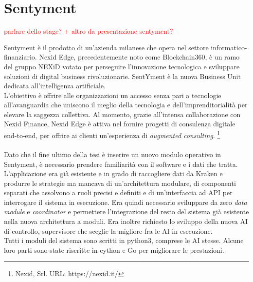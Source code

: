 \documentclass[a4paper,12pt]{report}
\begin{document}
\newpage
\chapter{Sentyment}
\label{cap2}
\textcolor{red}{parlare dello stage? + altro da presentazione sentyment?}

Sentyment è il prodotto di un'azienda milanese che opera nel settore informatico-finanziario. Nexid Edge, precedentemente noto come Blockchain360, è un ramo del gruppo NEXiD votato per perseguire l'innovazione tecnologica e sviluppare soluzioni di digital business rivoluzionarie. SentYment è la nuova Business Unit dedicata all'intelligenza artificiale.\\
L'obiettivo è offrire alle organizzazioni un accesso senza pari a tecnologie all'avanguardia che uniscono il meglio della tecnologia e dell'imprenditorialità per elevare la saggezza collettiva. Al momento, grazie all'intensa collaborazione con Nexid Finance, Nexid Edge è attiva nel fornire progetti di consulenza digitale end-to-end, per offrire ai clienti un'esperienza di \textit{augmented consulting}. \footnote{Nexid, Srl. URL: https://nexid.it/}
\\~\\

Dato che il fine ultimo della tesi è inserire un nuovo modulo operativo in Sentyment, è necessario prendere familiarità con il software e i dati che tratta.\\
L'applicazione era già esistente e in grado di raccogliere dati da Kraken e produrre le strategie ma mancava di un'architettura modulare, di componenti separati che assolvono a ruoli precisi e definiti e di un'interfaccia ad API per interrogare il sistema in esecuzione. Era quindi necessario sviluppare da zero \textit{data module} e \textit{coordinator} e permettere l'integrazione del resto del sistema già esistente nella nuova architettura a moduli. Era inoltre richiesto lo sviluppo della nuova AI di controllo, supervisore che sceglie la migliore fra le AI in esecuzione.\\
Tutti i moduli del sistema sono scritti in python3, comprese le AI stesse. Alcune loro parti sono state riscritte in cython e Go per migliorare le prestazioni.
\end{document}
